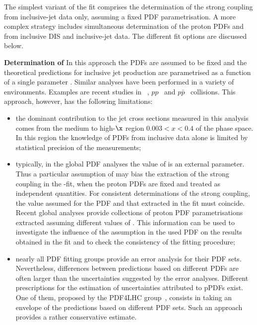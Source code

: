 The simplest variant of the fit comprises the determination of the strong coupling \asz from inclusive-jet data only, assuming a fixed PDF parametrisation. A more complex strategy includes simultaneous determination of the proton PDFs and \asz from inclusive DIS and inclusive-jet data. The different fit options are discussed below.
 
{\flushleft \textbf{Determination of \asz}}\newline
In this approach the PDFs are assumed to be fixed and the theoretical predictions for inclusive jet production are parametrised as a function of a single parameter \asz. Similar analyses have been performed in a variety of environments. Examples are recent studies in \ep~\cite{np:b864:1,epj:c75:65}, $pp$~\cite{CMS:2014mna,Chatrchyan:2013txa} and $p\bar{p}$~\cite{Affolder:2001hn,Abazov:2012lua,Abazov:2009nc} collisions. This approach, however, has the following limitations:
\begin{itemize}
 \item the dominant contribution to the jet cross sections measured in this analysis comes from the medium to high-$\x$ region $0.003<x<0.4$ of the phase space. In this region the knowledge of PDFs from \hera inclusive data alone is limited by statistical precision of the measurements;
 \item typically, in the global PDF analyses the value of \asz is an external parameter. Thus a particular assumption of \asz may bias the extraction of the strong coupling in the \as-fit, when the proton PDFs are fixed and treated as independent quantities. For consistent determinations of the strong coupling, the value assumed for the PDF and that extracted in the fit must coincide. Recent global analyses provide collections of proton PDF parametrisations extracted assuming different values of \asz. This information can be used to investigate the influence of the \asz assumption in the used PDF on the \as results obtained in the fit and to check the consistency of the fitting procedure;
 \item nearly all PDF fitting groups provide an error analysis for their PDF sets. Nevertheless, differences between predictions based on different PDFs are often larger than the uncertainties suggested by the error analyses. Different prescriptions for the estimation of uncertainties attributed to pPDFs exist. One of them, proposed by the PDF4LHC group~\cite{pdf4lhc:2011}, consists in taking an envelope of the predictions based on different PDF sets. Such an approach provides a rather conservative estimate. 
\end{itemize}

